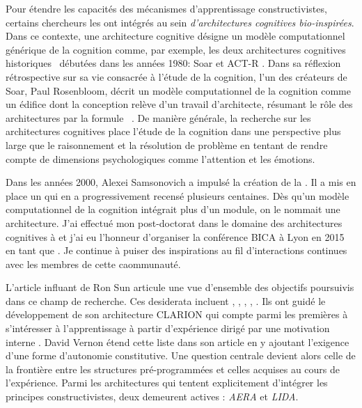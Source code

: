 \noindent
Pour étendre les capacités des mécanismes d'apprentissage constructivistes, certains chercheurs les ont intégrés au sein \emph{d'architectures cognitives bio-inspirées}. 
Dans ce contexte, une architecture cognitive désigne un modèle computationnel générique de la cognition comme, par exemple, les deux architectures cognitives \og historiques \fg\ débutées dans les années 1980:  Soar \cite{laird_soar_2019} et ACT-R \cite{anderson_atomic_2014}.
Dans sa réflexion rétrospective sur sa vie consacrée à l'étude de la cognition, l'un des créateurs de Soar, Paul Rosenbloom, décrit un modèle computationnel de la cognition comme un édifice dont la conception relève d'un travail d'architecte, résumant le rôle des architectures par la formule \og {} \fg\ \cite{rosenbloom_search_2025}.
De manière générale, la recherche sur les architectures cognitives place l'étude de la cognition dans une perspective plus large que le raisonnement et la résolution de problème en tentant de rendre compte de dimensions psychologiques comme l'attention et les émotions.  


Dans les années 2000, Alexei Samsonovich a impulsé la création de la . 
Il a mis en place un  \cite{samsonovich_toward_2010} qui en a progressivement recensé plusieurs centaines.  
Dès qu'un modèle computationnel de la cognition intégrait plus d'un module, on le nommait une architecture.
J'ai effectué mon post-doctorat dans le domaine des architectures cognitives à  et j'ai eu l'honneur d'organiser la conférence BICA à Lyon en 2015 en tant que . 
Je continue à puiser des inspirations au fil d'interactions continues avec les membres de cette caommunauté.


L'article influant de Ron Sun   \cite{sun_desiderata_2004} articule une vue d'ensemble des objectifs poursuivis dans ce champ de recherche. 
Ces desiderata incluent , , , , . 
Ils ont guidé le développement de son architecture CLARION qui compte parmi les premières à s'intéresser à l'apprentissage à partir d'expérience dirigé par une motivation interne \cite{sun_motivational_2009}. 
David Vernon étend cette liste dans son article  \cite{vernon_desiderata_2016} en y ajoutant l'exigence d'une forme d'autonomie constitutive. 
Une question centrale devient alors celle de la frontière entre les structures pré-programmées et celles acquises au cours de l'expérience.
Parmi les architectures qui tentent explicitement d’intégrer les principes constructivistes, deux demeurent actives : \emph{AERA} et \emph{LIDA}.


